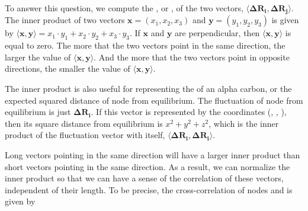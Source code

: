 To answer this question, we compute the , or , of the two vectors, $ \langle \mathbf{\Delta R_i}, \mathbf{\Delta R_j} \rangle $. The inner product of two vectors $\mathbf{x} = (x_1, x_2, x_3)$ and $\mathbf{y} = (y_1, y_2, y_3)$ is given by $ \langle \mathbf{x}, \mathbf{y} \rangle = x_1 \cdot y_1 + x_2 \cdot y_2 + x_3 \cdot y_3$. If $\mathbf{x}$ and $\mathbf{y}$ are perpendicular, then $ \langle \mathbf{x}, \mathbf{y} \rangle $ is equal to zero. The more that the two vectors point in the same direction, the larger the value of $\langle \mathbf{x}, \mathbf{y} \rangle $. And the more that the two vectors point in opposite directions, the smaller the value of $\langle \mathbf{x}, \mathbf{y} \rangle $.\\

\begin{qbox}[%
	Say that $\mathbf{x} = (1, -2, 3)$, $\mathbf{y} = (2, -3, 5)$, and  $\mathbf{z} = (-1, 3, -4)$. Compute the inner products $\langle \mathbf{x}, \mathbf{y} \rangle$ and $\langle \mathbf{x}, \mathbf{z} \rangle$  and ensure that your answers match the preceding observation.
	]\end{qbox}

The inner product is also useful for representing  the  of an alpha carbon, or the expected squared distance of node  from equilibrium. The fluctuation of node  from equilibrium is just $\mathbf{\Delta R_i}$. If this vector is represented by the coordinates (, , ), then its square distance from equilibrium is $x^2 + y^2 + z^2$, which is the inner product of the fluctuation vector with itself, $ \langle \mathbf{\Delta R_i}, \mathbf{\Delta R_i} \rangle $.\\

\begin{note}\end{note}

Long vectors pointing in the same direction will have a larger inner product than short vectors pointing in the same direction. As a result, we can normalize the inner product so that we can have a sense of the correlation of these vectors, independent of their length. To be precise, the cross-correlation of nodes  and  is given by

